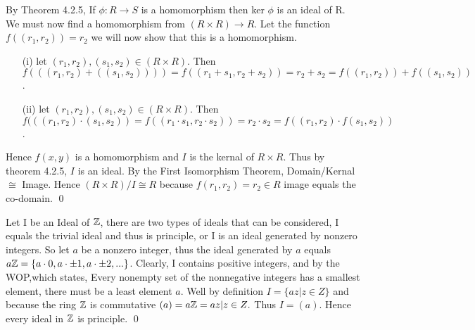 \documentclass[11pt]{article}
\begin{document}

\proof
{By Theorem 4.2.5, If \(\phi : R \rightarrow S\) is a homomorphism then ker \(\phi\) is an ideal of R. We must now find a homomorphism from \((R \times R) \rightarrow R\). Let the function \(f((r_1,r_2)) = r_2\) we will now show that this is a homomorphism.
\begin{itemize}
    \item[(i)] let \((r_1,r_2), (s_1,s_2) \in (R \times R)\). Then \(f(((r_1,r_2) + ((s_1,s_2)))) = f((r_1 + s_1,r_2 + s_2)) = r_2+s_2 = f((r_1,r_2))+f((s_1,s_2))\).
    \item[(ii)] let \((r_1,r_2), (s_1,s_2) \in (R \times R)\). Then \(f(((r_1,r_2)\cdot (s_1,s_2))= f((r_1 \cdot s_1,r_2 \cdot s_2)) = r_2 \cdot s_2 = f((r_1,r_2) \cdot f(s_1,s_2))\).
\end{itemize}}
Hence \(f(x,y)\) is a homomorphism and \(I\) is the kernal of \(R \times R\). Thus by theorem 4.2.5, \(I\) is an ideal. By the First Isomorphism Theorem, Domain/Kernal \(\cong\) Image. Hence \((R \times R)/I \cong R\) because \(f(r_1,r_2) = r_2 \in R\) image equals the co-domain.
\qed


\proof
{Let I be an Ideal of \({\mathbb{Z}}\), there are two types of ideals that can be considered, I equals the trivial ideal and thus is principle, or I is an ideal generated by nonzero integers. So let \(a\) be a nonzero integer, thus the ideal generated by \(a\) equals \(a{\mathbb{Z}} = \{a\cdot 0, a\cdot \pm 1, a\cdot \pm 2,...\}\). Clearly, I contains positive integers, and by the WOP,which states, Every nonempty set of the nonnegative integers has a smallest element, there must be a least element \(a\). Well by definition \(I = \{az | z \in Z\}\) and because the ring \({\mathbb{Z}}\) is commutative \((a)  = a{\mathbb{Z}} = {az|z\in Z}.\) Thus \(I = (a).\) Hence every ideal in \({\mathbb{Z}}\) is principle.}
\qed
\end{document}
